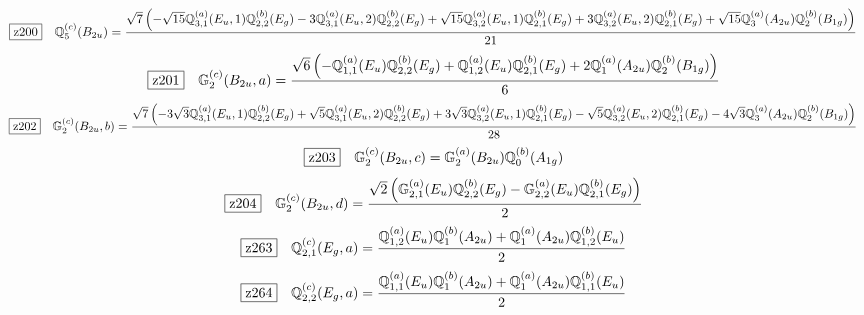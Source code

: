 \documentclass[fleqn,10pt,landscape]{jsarticle}
\begin{document}
\begin{dmath*}
\hspace*{3mm}\fbox{z200}\quad \mathbb{Q}_{5}^{(c)}(B_{2u})=\frac{\sqrt{7} \left(- \sqrt{15} \mathbb{Q}_{3,1}^{(a)}(E_{u},1) \mathbb{Q}_{2,2}^{(b)}(E_{g}) - 3 \mathbb{Q}_{3,1}^{(a)}(E_{u},2) \mathbb{Q}_{2,2}^{(b)}(E_{g}) + \sqrt{15} \mathbb{Q}_{3,2}^{(a)}(E_{u},1) \mathbb{Q}_{2,1}^{(b)}(E_{g}) + 3 \mathbb{Q}_{3,2}^{(a)}(E_{u},2) \mathbb{Q}_{2,1}^{(b)}(E_{g}) + \sqrt{15} \mathbb{Q}_{3}^{(a)}(A_{2u}) \mathbb{Q}_{2}^{(b)}(B_{1g})\right)}{21}
\end{dmath*}
\begin{dmath*}
\hspace*{3mm}\fbox{z201}\quad \mathbb{G}_{2}^{(c)}(B_{2u},a)=\frac{\sqrt{6} \left(- \mathbb{Q}_{1,1}^{(a)}(E_{u}) \mathbb{Q}_{2,2}^{(b)}(E_{g}) + \mathbb{Q}_{1,2}^{(a)}(E_{u}) \mathbb{Q}_{2,1}^{(b)}(E_{g}) + 2 \mathbb{Q}_{1}^{(a)}(A_{2u}) \mathbb{Q}_{2}^{(b)}(B_{1g})\right)}{6}
\end{dmath*}
\begin{dmath*}
\hspace*{3mm}\fbox{z202}\quad \mathbb{G}_{2}^{(c)}(B_{2u},b)=\frac{\sqrt{7} \left(- 3 \sqrt{3} \mathbb{Q}_{3,1}^{(a)}(E_{u},1) \mathbb{Q}_{2,2}^{(b)}(E_{g}) + \sqrt{5} \mathbb{Q}_{3,1}^{(a)}(E_{u},2) \mathbb{Q}_{2,2}^{(b)}(E_{g}) + 3 \sqrt{3} \mathbb{Q}_{3,2}^{(a)}(E_{u},1) \mathbb{Q}_{2,1}^{(b)}(E_{g}) - \sqrt{5} \mathbb{Q}_{3,2}^{(a)}(E_{u},2) \mathbb{Q}_{2,1}^{(b)}(E_{g}) - 4 \sqrt{3} \mathbb{Q}_{3}^{(a)}(A_{2u}) \mathbb{Q}_{2}^{(b)}(B_{1g})\right)}{28}
\end{dmath*}
\begin{dmath*}
\hspace*{3mm}\fbox{z203}\quad \mathbb{G}_{2}^{(c)}(B_{2u},c)=\mathbb{G}_{2}^{(a)}(B_{2u}) \mathbb{Q}_{0}^{(b)}(A_{1g})
\end{dmath*}
\begin{dmath*}
\hspace*{3mm}\fbox{z204}\quad \mathbb{G}_{2}^{(c)}(B_{2u},d)=\frac{\sqrt{2} \left(\mathbb{G}_{2,1}^{(a)}(E_{u}) \mathbb{Q}_{2,2}^{(b)}(E_{g}) - \mathbb{G}_{2,2}^{(a)}(E_{u}) \mathbb{Q}_{2,1}^{(b)}(E_{g})\right)}{2}
\end{dmath*}
\begin{dmath*}
\hspace*{3mm}\fbox{z263}\quad \mathbb{Q}_{2,1}^{(c)}(E_{g},a)=\frac{\mathbb{Q}_{1,2}^{(a)}(E_{u}) \mathbb{Q}_{1}^{(b)}(A_{2u}) + \mathbb{Q}_{1}^{(a)}(A_{2u}) \mathbb{Q}_{1,2}^{(b)}(E_{u})}{2}
\end{dmath*}
\begin{dmath*}
\hspace*{3mm}\fbox{z264}\quad \mathbb{Q}_{2,2}^{(c)}(E_{g},a)=\frac{\mathbb{Q}_{1,1}^{(a)}(E_{u}) \mathbb{Q}_{1}^{(b)}(A_{2u}) + \mathbb{Q}_{1}^{(a)}(A_{2u}) \mathbb{Q}_{1,1}^{(b)}(E_{u})}{2}
\end{dmath*}
\end{document}
